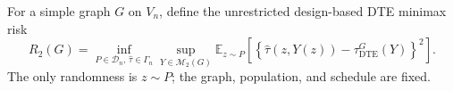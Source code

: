 For a simple graph \(G\) on \(V_n\), define the unrestricted design-based DTE minimax risk
\[
R_2(G)=\inf_{P\in\mathcal D_n,\,\widehat\tau\in\Gamma_n}
\sup_{Y\in\mathcal M_2(G)}
\mathbb E_{z\sim P}\!\left[
\left\{\widehat\tau(z,Y(z))-\tau_{\mathrm{DTE}}^G(Y)\right\}^2
\right].
\]
The only randomness is \(z\sim P\); the graph, population, and schedule are fixed.